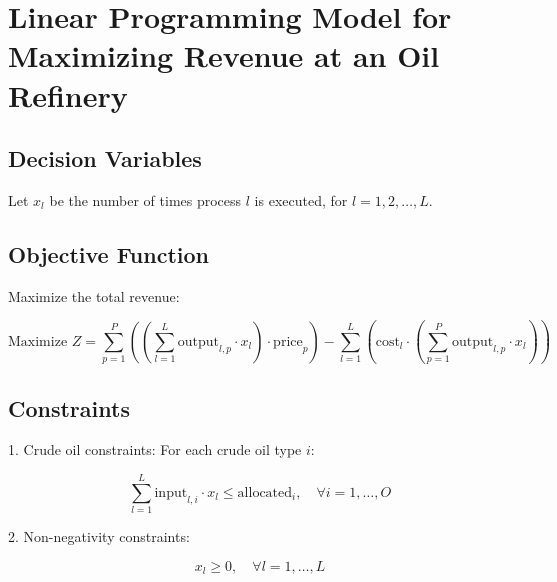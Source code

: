 \documentclass{article}
\begin{document}
\section*{Linear Programming Model for Maximizing Revenue at an Oil Refinery}

\subsection*{Decision Variables}
Let \( x_l \) be the number of times process \( l \) is executed, for \( l = 1, 2, \ldots, L \).

\subsection*{Objective Function}
Maximize the total revenue:

\[
\text{Maximize } Z = \sum_{p=1}^{P} \left( \left( \sum_{l=1}^{L} \text{output}_{l,p} \cdot x_l \right) \cdot \text{price}_p \right) - \sum_{l=1}^{L} \left( \text{cost}_l \cdot \left( \sum_{p=1}^{P} \text{output}_{l,p} \cdot x_l \right) \right)
\]

\subsection*{Constraints}

1. Crude oil constraints: For each crude oil type \( i \):

\[
\sum_{l=1}^{L} \text{input}_{l,i} \cdot x_l \leq \text{allocated}_i, \quad \forall i = 1, \ldots, O
\]

2. Non-negativity constraints:

\[
x_l \geq 0, \quad \forall l = 1, \ldots, L
\]
\end{document}
